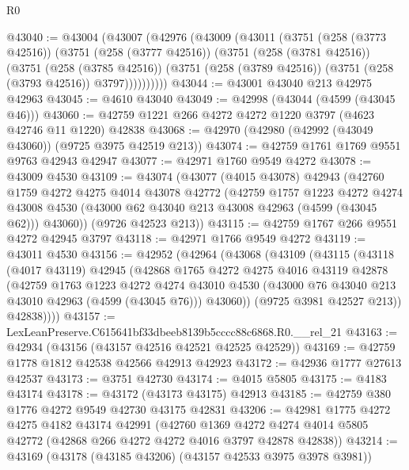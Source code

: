 \begin{lexlean}{R0}
\begin{coremodule}
@43040 := @43004
    (@43007
      (@42976
        (@43009
          (@43011
            (@3751
              (@258 (@3773 @42516))
              (@3751
                (@258 (@3777 @42516))
                (@3751
                  (@258 (@3781 @42516))
                  (@3751
                    (@258 (@3785 @42516))
                    (@3751 (@258 (@3789 @42516)) (@3751 (@258 (@3793 @42516)) @3797))))))))))
@43044 := @43001 @43040 @213 @42975 @42963
@43045 := @4610 @43040
@43049 := @42998 (@43044 (@4599 (@43045 @46)))
@43060 := @42759 @1221 @266 @4272 @4272 @1220 @3797 (@4623 @42746 @11 @1220) @42838
@43068 := @42970 (@42980 (@42992 (@43049 @43060)) (@9725 @3975 @42519 @213))
@43074 := @42759 @1761 @1769 @9551 @9763 @42943 @42947
@43077 := @42971 @1760 @9549 @4272
@43078 := @43009 @4530
@43109 := @43074
    (@43077
      (@4015 @43078)
      @42943
      (@42760
        @1759
        @4272
        @4275
        @4014
        @43078
        @42772
        (@42759
          @1757
          @1223
          @4272
          @4274
          @43008
          @4530
          (@43000 @62 @43040 @213 @43008 @42963 (@4599 (@43045 @62)))
          @43060))
      (@9726 @42523 @213))
@43115 := @42759 @1767 @266 @9551 @4272 @42945 @3797
@43118 := @42971 @1766 @9549 @4272
@43119 := @43011 @4530
@43156 := @42952
    (@42964
      (@43068
        (@43109
          (@43115
            (@43118
              (@4017 @43119)
              @42945
              (@42868
                @1765
                @4272
                @4275
                @4016
                @43119
                @42878
                (@42759
                  @1763
                  @1223
                  @4272
                  @4274
                  @43010
                  @4530
                  (@43000 @76 @43040 @213 @43010 @42963 (@4599 (@43045 @76)))
                  @43060))
              (@9725 @3981 @42527 @213))
            @42838))))
@43157 := LexLeanPreserve.C615641bf33dbeeb8139b5cccc88c6868.R0.__rel_21
@43163 := @42934 (@43156 (@43157 @42516 @42521 @42525 @42529))
@43169 := @42759 @1778 @1812 @42538 @42566 @42913 @42923
@43172 := @42936 @1777 @27613 @42537
@43173 := @3751 @42730
@43174 := @4015 @5805
@43175 := @4183 @43174
@43178 := @43172 (@43173 @43175) @42913
@43185 := @42759 @380 @1776 @4272 @9549 @42730 @43175 @42831
@43206 := @42981
    @1775
    @4272
    @4275
    @4182
    @43174
    @42991
    (@42760
      @1369
      @4272
      @4274
      @4014
      @5805
      @42772
      (@42868 @266 @4272 @4272 @4016 @3797 @42878 @42838))
@43214 := @43169 (@43178 (@43185 @43206) (@43157 @42533 @3975 @3978 @3981))

\end{coremodule}
\end{lexlean}
